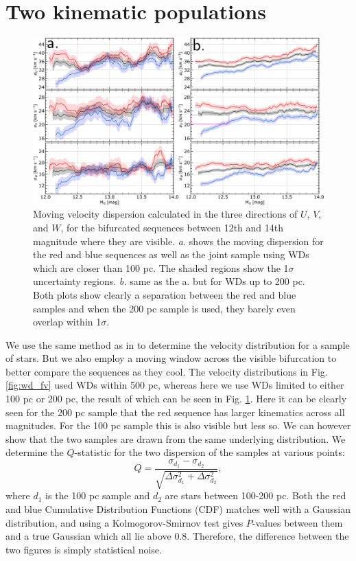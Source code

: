 \section{Two kinematic populations}\label{sec:p2-populations}
\begin{figure}[t]
    \centering
    \includegraphics[width=1\textwidth]{images/moving_dispersion.pdf}
    \caption{Moving velocity dispersion calculated in the three directions of $U$, $V$, and $W$, for the bifurcated sequences between 12th and 14th magnitude where they are visible. \textit{a.} shows the moving dispersion for the red and blue sequences as well as the joint sample using WDs which are closer than 100 pc. The shaded regions show the 1$\sigma$ uncertainty regions. \textit{b.} same as the a. but for WDs up to 200 pc. Both plots show clearly a separation between the red and blue samples and when the 200 pc sample is used, they barely even overlap within 1$\sigma$.} %
    \label{fig:moving_disp}
\end{figure}
We use the same method as in \cite{dehnen:98b} to determine the velocity distribution for a sample of stars. But we also employ a moving window across the visible bifurcation to better compare the sequences as they cool. The velocity distributions in Fig. \ref{fig:wd_fv} used WDs within 500 pc, whereas here we use WDs limited to either 100 pc or 200 pc, the result of which can be seen in Fig. \ref{fig:moving_disp}. Here it can be clearly seen for the 200 pc sample that the red sequence has larger kinematics across all magnitudes. For the 100 pc sample this is also visible but less so. We can however show that the two samples are drawn from the same underlying distribution. We determine the $Q$-statistic for the two dispersion of the samples at various points: 
\begin{equation}
    Q = \frac{\sigma_{d_1} - \sigma_{d_2}}{\sqrt{\Delta \sigma_{d_1}^2 + \Delta \sigma_{d_2}^2}},
\end{equation}
where $d_1$ is the 100 pc sample and $d_2$ are stars between 100-200 pc. Both the red and blue Cumulative Distribution Functions (CDF) matches well with a Gaussian distribution, and using a Kolmogorov-Smirnov test gives $P$-values between them and a true Gaussian which all lie above 0.8. Therefore, the difference between the two figures is simply statistical noise. 

